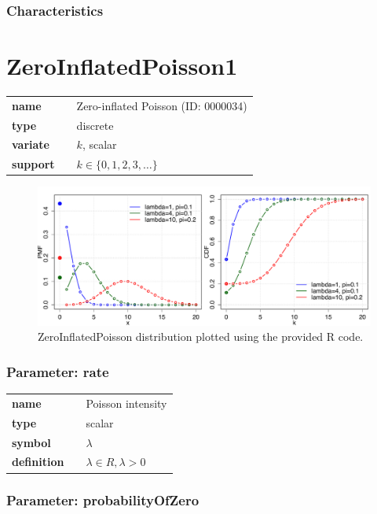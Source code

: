 \subsubsection*{Characteristics}
\smallskip
\section*{ZeroInflatedPoisson1} 

  \bigskip 

\begin{tabular}{p{2cm}cl}
\textbf{name} & & Zero-inflated Poisson (ID: 0000034)\\ 
 
\textbf{type} & & discrete \\ 

\textbf{variate} & & $k$, scalar \\ 

\textbf{support} & & $k \in \{0,1,2,3,\dots\}$
\end{tabular}

\begin{figure}[ht!]
\centering
  \includegraphics[width=140mm]{pics/ZeroInflatedPoisson.pdf}
 \caption{ZeroInflatedPoisson distribution plotted using the provided R code.}
 \label{fig:ZeroInflatedPoisson}
\end{figure}

\subsubsection*{Parameter: rate}

\noindent\begin{tabular}{p{2cm}cl}
\textbf{name} & & Poisson intensity \\
\textbf{type} & & scalar \\
\textbf{symbol} & & $\lambda$  \\
\textbf{definition} & & $\lambda \in R, \lambda > 0$
\end{tabular}
\subsubsection*{Parameter: probabilityOfZero}

